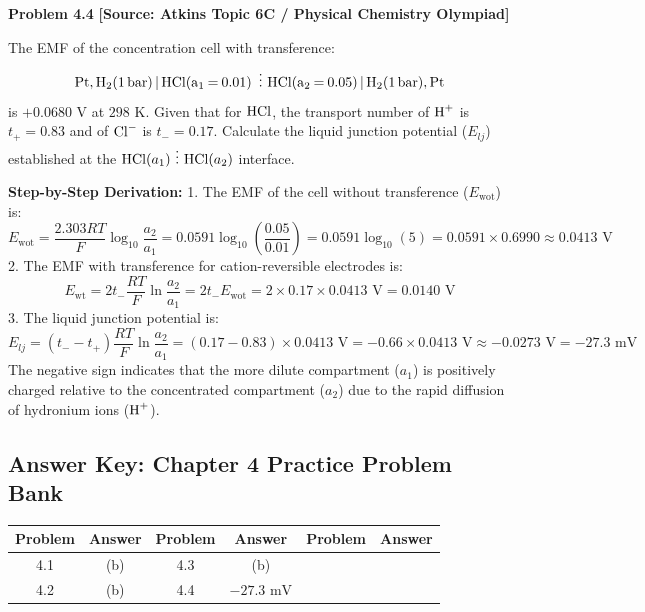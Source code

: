 \begin{problembox}
\textbf{Problem 4.4} \hfill \textbf{[Source: Atkins Topic 6C / Physical Chemistry Olympiad]}

The EMF of the concentration cell with transference:
\begin{equation*}
    \ce{Pt, H2(1 bar) | HCl(a_1 = 0.01) \ \vdots \ HCl(a_2 = 0.05) | H2(1 bar), Pt}
\end{equation*}
is $+0.0680\text{ V}$ at $298\text{ K}$. Given that for $\ce{HCl}$, the transport number of $\ce{H+}$ is $t_+ = 0.83$ and of $\ce{Cl-}$ is $t_- = 0.17$.
Calculate the liquid junction potential ($E_{lj}$) established at the $\ce{HCl}(a_1) \ \vdots \ \ce{HCl}(a_2)$ interface.
\end{problembox}
\begin{solution}
\textbf{Step-by-Step Derivation:}
1. The EMF of the cell without transference ($E_{\text{wot}}$) is:
\begin{equation*}
    E_{\text{wot}} = \frac{2.303 RT}{F} \log_{10} \frac{a_2}{a_1} = 0.0591 \log_{10} \left(\frac{0.05}{0.01}\right) = 0.0591 \log_{10}(5) = 0.0591 \times 0.6990 \approx 0.0413\text{ V}
\end{equation*}
2. The EMF with transference for cation-reversible electrodes is:
\begin{equation*}
    E_{\text{wt}} = 2 t_- \frac{RT}{F} \ln \frac{a_2}{a_1} = 2 t_- E_{\text{wot}} = 2 \times 0.17 \times 0.0413\text{ V} = 0.0140\text{ V}
\end{equation*}
3. The liquid junction potential is:
\begin{equation*}
    E_{lj} = (t_- - t_+) \frac{RT}{F} \ln \frac{a_2}{a_1} = (0.17 - 0.83) \times 0.0413\text{ V} = -0.66 \times 0.0413\text{ V} \approx -0.0273\text{ V} = -27.3\text{ mV}
\end{equation*}
The negative sign indicates that the more dilute compartment ($a_1$) is positively charged relative to the concentrated compartment ($a_2$) due to the rapid diffusion of hydronium ions ($\ce{H+}$).
\end{solution}

\ifshowsolutions
\else
\newpage
\subsection*{Answer Key: Chapter 4 Practice Problem Bank}

\begin{center}
\renewcommand{\arraystretch}{1.3}
\begin{tabular}{|c|c||c|c||c|c|}
\hline
\textbf{Problem} & \textbf{Answer} & \textbf{Problem} & \textbf{Answer} & \textbf{Problem} & \textbf{Answer} \\
\hline
4.1 & (b) & 4.3 & (b) & & \\
4.2 & (b) & 4.4 & $-27.3\text{ mV}$ & & \\
\hline
\end{tabular}
\end{center}
\fi
